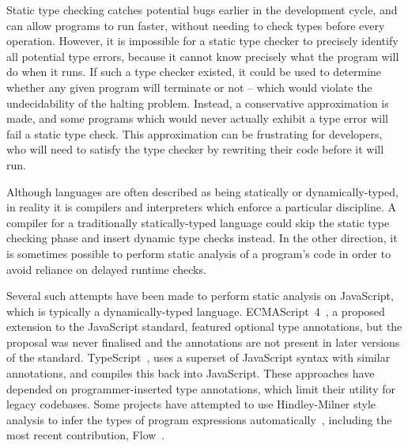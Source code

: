 \documentclass[12pt,a4paper,twoside,openright]{report}
\begin{document}
Static type checking catches potential bugs earlier in the development cycle,
and can allow programs to run faster, without needing to check types before
every operation. However, it is impossible for a static type checker to
precisely identify all potential type errors, because it cannot know precisely
what the program will do when it runs. If such a type checker existed, it could
be used to determine whether any given program will terminate or not -- which %
would violate the undecidability of the halting problem. Instead, a
conservative approximation is made, and some programs which would never
actually exhibit a type error will fail a static type check. This approximation
can be frustrating for developers, who will need to satisfy the type checker by
rewriting their code before it will run.

Although languages are often described as being statically or
dynamically-typed, in reality it is compilers and interpreters which enforce a
particular discipline. A compiler for a traditionally statically-typed language
could skip the static type checking phase and insert dynamic type checks
instead. In the other direction, it is sometimes possible to perform static
analysis of a program's code in order to avoid reliance on delayed runtime
checks.

Several such attempts have been made to perform static analysis on JavaScript,
which is typically a dynamically-typed language. ECMAScript~4~\cite{es4},
a proposed extension to the JavaScript standard, featured optional type
annotations, but the proposal was never finalised and the annotations are not
present in later versions of the standard. TypeScript~\cite{ts}, uses a
superset of JavaScript syntax with similar annotations, and compiles this back
into JavaScript. These approaches have depended on programmer-inserted type
annotations, which limit their utility for legacy codebases. Some projects
have attempted to use Hindley-Milner style analysis to infer the types of
program expressions automatically~\cite{anderson06, tajs, guha}, including the most
recent contribution, Flow~\cite{flow}. 
\end{document}
